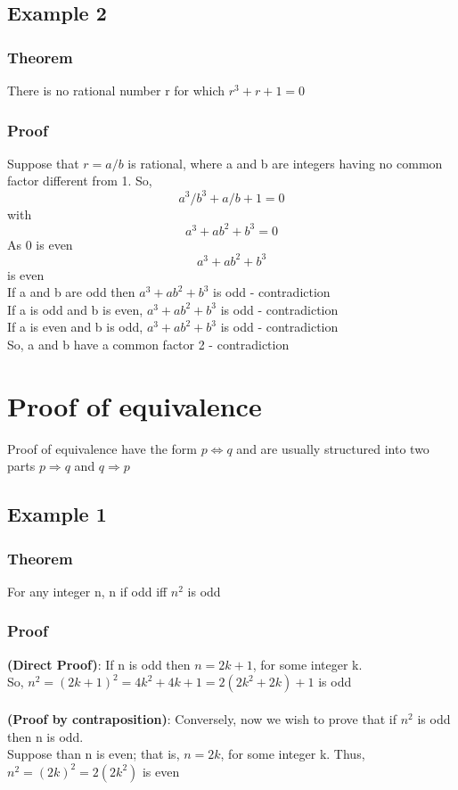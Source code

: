 \documentclass{article}[18pt]
\begin{document}
\subsection{Example 2}
\subsubsection{Theorem}
There is no rational number r for which $r^3+r+1=0$
\subsubsection{Proof}
Suppose that $r=a/b$ is rational, where a and b are integers having no common factor different from 1. So,
$$a^3/b^3+a/b+1=0$$
with
$$a^3+ab^2+b^3=0$$
As 0 is even
$$a^3+ab^2+b^3$$
is even\\
If a and b are odd then $a^3+ab^2+b^3$ is odd - contradiction\\
If a is odd and b is even, $a^3+ab^2+b^3$ is odd - contradiction\\
If a is even and b is odd, $a^3+ab^2+b^3$ is odd - contradiction\\
So, a and b have a common factor 2 - contradiction
\section{Proof of equivalence}
Proof of equivalence have the form $p\Leftrightarrow q$ and are usually structured into two parts $p\Rightarrow q$ and $q\Rightarrow p$
\subsection{Example 1}
\subsubsection{Theorem}
For any integer n, n if odd iff $n^2$ is odd
\subsubsection{Proof}
\textbf{(Direct Proof)}: If n is odd then $n=2k+1$, for some integer k.\\
So, $n^2=(2k+1)^2=4k^2+4k+1=2(2k^2+2k)+1$ is odd\\
\\
\textbf{(Proof by contraposition)}: Conversely, now we wish to prove that if $n^2$ is odd then n is odd.\\
Suppose than n is even; that is, $n=2k$, for some integer k. Thus, $n^2=(2k)^2=2(2k^2)$ is even
\end{document}
